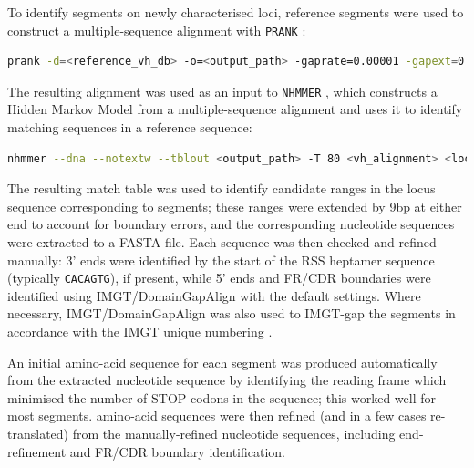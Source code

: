 \subsubsection{\vh}

To identify \vh segments on newly characterised loci, reference \vh segments were used to construct a multiple-sequence alignment with \lstinline{PRANK} \parencite{loytynoja2014prank}:

\begin{lstlisting}[language=bash]
prank -d=<reference_vh_db> -o=<output_path> -gaprate=0.00001 -gapext=0.00001 -F -termgap
\end{lstlisting}

The resulting alignment was used as an input to \lstinline{NHMMER} \parencite{wheeler2013nhmmer,eddy2011hmm,eddy2009homology,eddy2008alignment}, which constructs a Hidden Markov Model from a multiple-sequence alignment and uses it to identify matching sequences in a reference sequence:

\begin{lstlisting}[language=bash]
nhmmer --dna --notextw --tblout <output_path> -T 80 <vh_alignment> <locus_sequence_path>
\end{lstlisting}

The resulting match table was used to identify candidate ranges in the locus sequence corresponding to \vh segments; these ranges were extended by 9bp at either end to account for boundary errors, and the corresponding nucleotide sequences were extracted to a FASTA file. Each sequence was then checked and refined manually: 3' ends were identified by the start of the RSS heptamer sequence (typically \texttt{CACAGTG}), if present, while 5' ends and FR/CDR boundaries were identified using IMGT/DomainGapAlign \parencite{ehrenmann2011domaingapalign} with the default settings. Where necessary, IMGT/DomainGapAlign was also used to IMGT-gap the \vh segments in accordance with the IMGT unique numbering \parencite{lefranc2003vnumbering}. %

An initial amino-acid sequence for each \vh segment was produced automatically from the extracted nucleotide sequence by identifying the reading frame which minimised the number of STOP codons in the sequence; this worked well for most segments. \vh amino-acid sequences were then refined (and in a few cases re-translated) from the manually-refined nucleotide sequences, including end-refinement and FR/CDR boundary identification.

